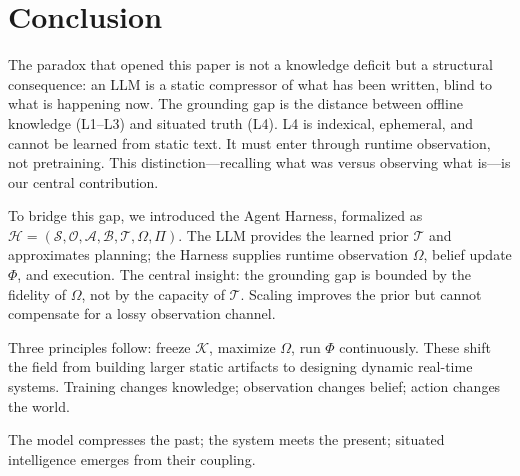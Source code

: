 \section{Conclusion}

The paradox that opened this paper is not a knowledge deficit but a structural consequence: an LLM is a static compressor of what has been written, blind to what is happening now. The grounding gap is the distance between offline knowledge (L1--L3) and situated truth (L4). L4 is indexical, ephemeral, and cannot be learned from static text. It must enter through runtime observation, not pretraining. This distinction---recalling what was versus observing what is---is our central contribution.

To bridge this gap, we introduced the Agent Harness, formalized as \(\mathcal{H} = (\mathcal{S}, \mathcal{O}, \mathcal{A}, \mathcal{B}, \mathcal{T}, \Omega, \Pi)\). The LLM provides the learned prior \(\mathcal{T}\) and approximates planning; the Harness supplies runtime observation \(\Omega\), belief update \(\Phi\), and execution. The central insight: the grounding gap is bounded by the fidelity of \(\Omega\), not by the capacity of \(\mathcal{T}\). Scaling improves the prior but cannot compensate for a lossy observation channel.

Three principles follow: freeze \(\mathcal{K}\), maximize \(\Omega\), run \(\Phi\) continuously. These shift the field from building larger static artifacts to designing dynamic real-time systems. Training changes knowledge; observation changes belief; action changes the world.

The model compresses the past; the system meets the present; situated intelligence emerges from their coupling.
